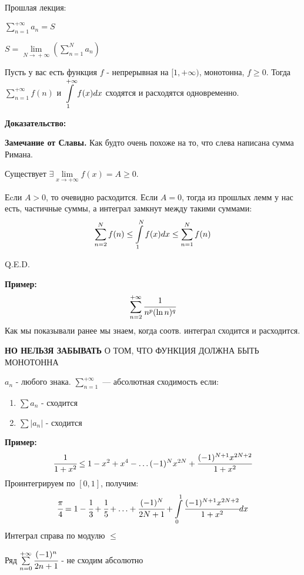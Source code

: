 Прошлая лекция:

$\sum\limits_{n=1}^{+\infty} a_n = S$

$S  = \lim\limits_{N \xrightarrow{} +\infty} (\sum\limits_{n=1}^N
 a_n )$




Пусть у вас есть функция $f$ - непрерывная на $[1,+\infty)$, монотонна, $f\geq 0 $. Тогда $\sum\limits_{n=1}^{+\infty}f(n)$ и $\displaystyle\int\limits_{1}^{+\infty}f(x)dx$ сходятся и расходятся одновременно.

\textbf{Доказательство:}

\textbf{Замечание от Славы.} Как будто очень похоже на то, что слева написана сумма Римана.

Существует $\exists \lim\limits_{x\rightarrow +\infty}f(x) = A \geq 0$.

Еcли $A>0$, то очевидно расходится. Если $A = 0$, тогда из прошлых лемм у нас есть, частичные суммы, а интеграл замкнут между такими суммами:
$$\sum\limits_{n=2}^{N}f(n)\leq \displaystyle\int\limits_{1}^{N} f(x) dx\leq \sum\limits_{n=1}^{N} f(n)$$


\hfill Q.E.D.

\textbf{Пример:} 
$$\sum\limits_{n=2}^{+\infty} \cfrac{1}{n^p (\ln n)^q}$$
Как мы показывали ранее мы знаем, когда соотв. интеграл сходится и расходится.

\textbf{НО НЕЛЬЗЯ ЗАБЫВАТЬ} О ТОМ, ЧТО ФУНКЦИЯ ДОЛЖНА  БЫТЬ МОНОТОННА


$a_n$ - любого знака. $\sum\limits_{n=1}^{+\infty}$ --- абсолютная сходимость если:
\begin{enumerate}
    \item $\sum a_n$ - сходится
    \item $\sum |a_n|$ - сходится
\end{enumerate}

\textbf{Пример:}
$$\cfrac{1}{1+x^2}\leq 1 - x^2  + x^4 - \ldots (-1)^N x^{2N} + \cfrac{(-1)^{N+1}x^{2N+2}}{1+x^2}$$
Проинтегрируем по $[0,1]$, получим:
$$\cfrac{\pi}{4}= 1 -\cfrac{1}{3} + \cfrac{1}{5}+\ldots +\cfrac{(-1)^N}{2N+1}+\displaystyle\int\limits_{0}^{1}\cfrac{(-1)^{N+1}x^{2N+2}}{1+x^2}dx$$
Интеграл справа по модулю $\leq$ %

Ряд $\sum\limits_{n=0}^{+\infty}\cfrac{(-1)^n}{2n+1}$ - не сходим абсолютно

